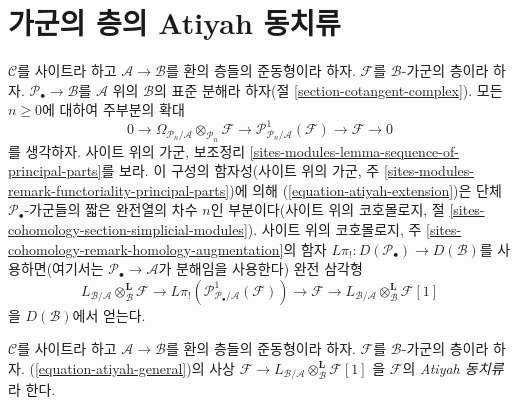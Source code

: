 \section{가군의 층의 Atiyah 동치류}
\label{section-atiyah-general}

\noindent
$\mathcal{C}$를 사이트라 하고 $\mathcal{A} \to \mathcal{B}$를 환의 층들의
준동형이라 하자. $\mathcal{F}$를 $\mathcal{B}$-가군의 층이라 하자.
$\mathcal{P}_\bullet \to \mathcal{B}$를 $\mathcal{A}$ 위의
$\mathcal{B}$의 표준 분해라 하자(절 \ref{section-cotangent-complex}). 모든
$n \geq 0$에 대하여 주부분의 확대
\begin{equation}
\label{equation-atiyah-extension}
0 \to
\Omega_{\mathcal{P}_n/\mathcal{A}} \otimes_{\mathcal{P}_n} \mathcal{F} \to
\mathcal{P}^1_{\mathcal{P}_n/\mathcal{A}}(\mathcal{F}) \to
\mathcal{F} \to 0
\end{equation}
를 생각하자. 사이트 위의 가군, 보조정리
\ref{sites-modules-lemma-sequence-of-principal-parts}를 보라. 이 구성의
함자성(사이트 위의 가군, 주
\ref{sites-modules-remark-functoriality-principal-parts})에 의해
(\ref{equation-atiyah-extension})은 단체 $\mathcal{P}_\bullet$-가군들의
짧은 완전열의 차수 $n$인 부분이다(사이트 위의 코호몰로지, 절
\ref{sites-cohomology-section-simplicial-modules}). 사이트 위의 코호몰로지,
주 \ref{sites-cohomology-remark-homology-augmentation}의 함자
$L\pi_! : D(\mathcal{P}_\bullet) \to D(\mathcal{B})$를 사용하면(여기서는
$\mathcal{P}_\bullet \to \mathcal{A}$가 분해임을 사용한다) 완전 삼각형
\begin{equation}
\label{equation-atiyah-general}
L_{\mathcal{B}/\mathcal{A}} \otimes_\mathcal{B}^\mathbf{L} \mathcal{F} \to
L\pi_!\left(\mathcal{P}^1_{\mathcal{P}_\bullet/\mathcal{A}}(\mathcal{F})\right)
\to \mathcal{F} \to
L_{\mathcal{B}/\mathcal{A}} \otimes_\mathcal{B}^\mathbf{L} \mathcal{F} [1]
\end{equation}
을 $D(\mathcal{B})$에서 얻는다.

\begin{definition}
\label{definition-atiyah-class-general}
$\mathcal{C}$를 사이트라 하고 $\mathcal{A} \to \mathcal{B}$를 환의 층들의
준동형이라 하자. $\mathcal{F}$를 $\mathcal{B}$-가군의 층이라 하자.
(\ref{equation-atiyah-general})의 사상 $\mathcal{F} \to
L_{\mathcal{B}/\mathcal{A}} \otimes_\mathcal{B}^\mathbf{L} \mathcal{F}[1]$
을 $\mathcal{F}$의 {\it Atiyah 동치류}라 한다.
\end{definition}










